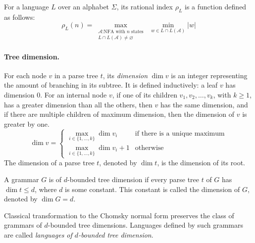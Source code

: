 \documentclass[runningheads]{llncs}
\renewcommand{\emptyset}{\varnothing}
\begin{document}
For a language $L$ over an alphabet $\Sigma$,
its rational index $\rho_L$ is a function defined as follows:
\begin{equation*}
	\rho_L(n)
		=
	\max_{\substack{\mathcal{A} \text{:NFA with }n\text{ states} \\ L \cap L(\mathcal{A}) \neq \emptyset}}
	\;
	\min_{w \in L \cap L(\mathcal{A})}|w|
\end{equation*}


\paragraph{Tree dimension.} 
For each node $v$ in a parse tree $t$,
its \emph{dimension} $\dim v$ is an integer
representing the amount of branching in its subtree.
It is defined inductively: %
a leaf $v$ has dimension $0$.
For an internal node $v$, if one of its children $v_1, v_2, \ldots, v_k$, with $k \geqslant 1$,
has a greater dimension than all the others,
then $v$ has the same dimension,
and if there are multiple children of maximum dimension,
then the dimension of $v$ is greater by one.
\begin{equation*}
	\dim v
		=
	\begin{cases}
	\max_{i \in \{1, \ldots, k\}} \dim v_i
		&\text{if there is a unique maximum} \\
	\max_{i \in \{1, \ldots, k\}} \dim v_i +1
		&\text{otherwise}
	\end{cases}
\end{equation*}
The dimension of a parse tree $t$, denoted by $\dim t$, is the dimension of its root. 


\begin{definition}
A grammar $G$ is of $d$-bounded tree dimension
if every parse tree $t$ of $G$ has $\dim t \leqslant d$,
where $d$ is some constant.
This constant is called the dimension of $G$, denoted by $\dim G=d$.
\end{definition}

Classical transformation to the Chomsky normal form
preserves the class of grammars of $d$-bounded tree dimensions.
Languages defined by such grammars are called \emph{languages of $d$-bounded tree dimension}.
\end{document}
